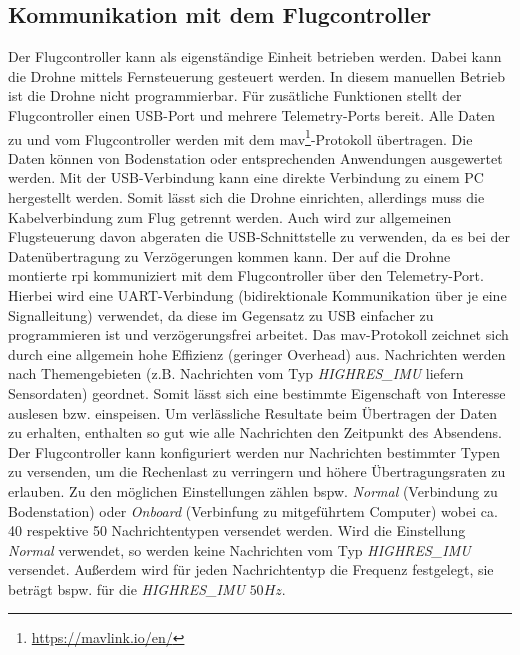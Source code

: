 \subsection{Kommunikation mit dem Flugcontroller}\label{chap:drone_coms}
Der Flugcontroller kann als eigenständige Einheit betrieben werden. Dabei kann die Drohne mittels Fernsteuerung gesteuert werden. In diesem manuellen Betrieb ist die Drohne nicht programmierbar.\newline
Für zusätliche Funktionen stellt der Flugcontroller einen USB-Port und mehrere Telemetry-Ports bereit. Alle Daten zu und vom Flugcontroller werden mit dem \gls{mav}\footnote{\url{https://mavlink.io/en/}}-Protokoll übertragen. Die Daten können von Bodenstation oder entsprechenden Anwendungen ausgewertet werden. Mit der USB-Verbindung kann eine direkte Verbindung zu einem PC hergestellt werden. Somit lässt sich die Drohne einrichten, allerdings muss die Kabelverbindung zum Flug getrennt werden. Auch wird zur allgemeinen Flugsteuerung davon abgeraten die USB-Schnittstelle zu verwenden, da es bei der Datenübertragung zu Verzögerungen kommen kann.\newline
Der auf die Drohne montierte \gls{rpi} kommuniziert mit dem Flugcontroller über den Telemetry-Port. Hierbei wird eine UART-Verbindung (bidirektionale Kommunikation über je eine Signalleitung) verwendet, da diese im Gegensatz zu USB einfacher zu programmieren ist und verzögerungsfrei arbeitet.\newline
Das \gls{mav}-Protokoll zeichnet sich durch eine allgemein hohe Effizienz (geringer Overhead) aus. Nachrichten werden nach Themengebieten (z.B. Nachrichten vom Typ \textit{HIGHRES\_IMU} liefern Sensordaten) geordnet. Somit lässt sich eine bestimmte Eigenschaft von Interesse auslesen bzw. einspeisen. Um verlässliche Resultate beim Übertragen der Daten zu erhalten, enthalten so gut wie alle Nachrichten den Zeitpunkt des Absendens.\newline
Der Flugcontroller kann konfiguriert werden nur Nachrichten bestimmter Typen zu versenden, um die Rechenlast zu verringern und höhere Übertragungsraten zu erlauben. Zu den möglichen Einstellungen zählen bspw. \textit{Normal} (Verbindung zu Bodenstation) oder \textit{Onboard} (Verbinfung zu mitgeführtem Computer) wobei ca. 40 respektive 50 Nachrichtentypen versendet werden. Wird die Einstellung \textit{Normal} verwendet, so werden keine Nachrichten vom Typ \textit{HIGHRES\_IMU} versendet. Außerdem wird für jeden Nachrichtentyp die Frequenz festgelegt, sie beträgt bspw. für die \textit{HIGHRES\_IMU} $50Hz$. 

